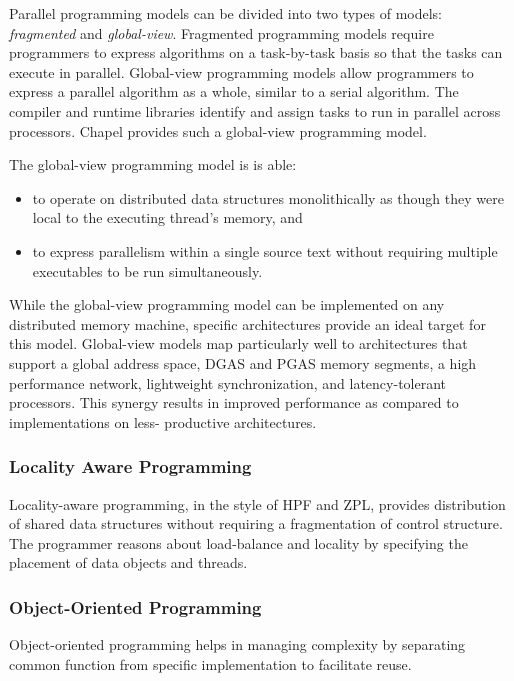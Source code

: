 Parallel programming models can be divided into two types of models:
{\em fragmented} and {\em global-view}.  Fragmented programming models
require programmers to express algorithms on a task-by-task basis so that
the tasks can execute in parallel.  Global-view programming models
allow programmers to express a parallel algorithm as a whole, similar to
a serial algorithm.  The compiler and runtime libraries identify and assign
tasks to run in parallel across processors.  Chapel provides such a global-view 
programming model.

The global-view programming model is is able:
\begin{itemize}
\item to operate on distributed data structures monolithically as 
though they were local to the executing thread's memory, and 
\item to express parallelism within a single source text without requiring 
multiple executables to be run simultaneously. 
\end{itemize}
While the global-view programming model can be implemented on any distributed memory 
machine, specific architectures provide an ideal target for this model.  
Global-view models map particularly well to architectures that 
support a global address space, DGAS and PGAS memory segments, a high performance 
network, lightweight synchronization, and latency-tolerant processors.  This 
synergy results in improved performance as compared to implementations on less-
productive architectures.

\subsubsection{Locality Aware Programming}
\label{Locality_Aware_Programming}

Locality-aware programming, in the style of HPF and
ZPL, provides distribution of shared data structures without
requiring a fragmentation of control structure. The programmer
reasons about load-balance and locality by specifying
the placement of data objects and threads.

\subsubsection{Object-Oriented Programming}
\label{Object-Oriented_Programming}

Object-oriented programming helps in managing complexity
by separating common function from specific implementation
to facilitate reuse.

